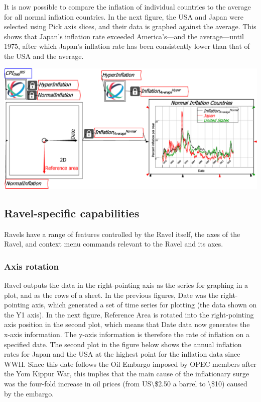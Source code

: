 It is now possible to compare the inflation of individual countries
to the average for all normal inflation countries. In the next figure,
the USA and Japan were selected using Pick axis slices, and their
data is graphed against the average. This shows that Japan's inflation
rate exceeded America's---and the average---until 1975, after which
Japan's inflation rate has been consistently lower than that of the
USA and the average.

\includegraphics[width=15cm]{images/CPI_SubsetsAverageVsSelection}

\subsection{Ravel-specific capabilities}

Ravels have a range of features controlled by the Ravel itself, the
axes of the Ravel, and context menu commands relevant to the Ravel
and its axes.

\subsubsection{Axis rotation}

Ravel outputs the data in the right-pointing axis as the series for
graphing in a plot, and as the rows of a sheet. In the previous figures,
Date was the right-pointing axis, which generated a set of time series
for plotting (the data shown on the Y1 axis). In the next figure,
Reference Area is rotated into the right-pointing axis position in
the second plot, which means that Date data now generates the x-axis
information. The y-axis information is therefore the rate of inflation
on a specified date. The second plot in the figure below shows the
annual inflation rates for Japan and the USA at the highest point
for the inflation data since WWII. Since this date follows the Oil
Embargo imposed by OPEC members after the Yom Kippur War, this implies
that the main cause of the inflationary surge was the four-fold increase
in oil prices (from US\textbackslash\$2.50 a barrel to \textbackslash\$10)
caused by the embargo.

